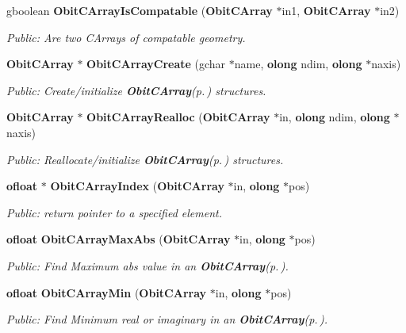 \begin{CompactItemize}
gboolean {\bf Obit\-CArray\-Is\-Compatable} ({\bf Obit\-CArray} $\ast$in1, {\bf Obit\-CArray} $\ast$in2)
\begin{CompactList}\small\item\em Public: Are two CArrays of compatable geometry. \item\end{CompactList}\item 
{\bf Obit\-CArray} $\ast$ {\bf Obit\-CArray\-Create} (gchar $\ast$name, {\bf olong} ndim, {\bf olong} $\ast$naxis)
\begin{CompactList}\small\item\em Public: Create/initialize {\bf Obit\-CArray}{\rm (p.\,\pageref{structObitCArray})} structures. \item\end{CompactList}\item 
{\bf Obit\-CArray} $\ast$ {\bf Obit\-CArray\-Realloc} ({\bf Obit\-CArray} $\ast$in, {\bf olong} ndim, {\bf olong} $\ast$naxis)
\begin{CompactList}\small\item\em Public: Reallocate/initialize {\bf Obit\-CArray}{\rm (p.\,\pageref{structObitCArray})} structures. \item\end{CompactList}\item 
{\bf ofloat} $\ast$ {\bf Obit\-CArray\-Index} ({\bf Obit\-CArray} $\ast$in, {\bf olong} $\ast$pos)
\begin{CompactList}\small\item\em Public: return pointer to a specified element. \item\end{CompactList}\item 
{\bf ofloat} {\bf Obit\-CArray\-Max\-Abs} ({\bf Obit\-CArray} $\ast$in, {\bf olong} $\ast$pos)
\begin{CompactList}\small\item\em Public: Find Maximum abs value in an {\bf Obit\-CArray}{\rm (p.\,\pageref{structObitCArray})}. \item\end{CompactList}\item 
{\bf ofloat} {\bf Obit\-CArray\-Min} ({\bf Obit\-CArray} $\ast$in, {\bf olong} $\ast$pos)
\begin{CompactList}\small\item\em Public: Find Minimum real or imaginary in an {\bf Obit\-CArray}{\rm (p.\,\pageref{structObitCArray})}. \item\end{CompactList}\item 

\end{CompactItemize}
